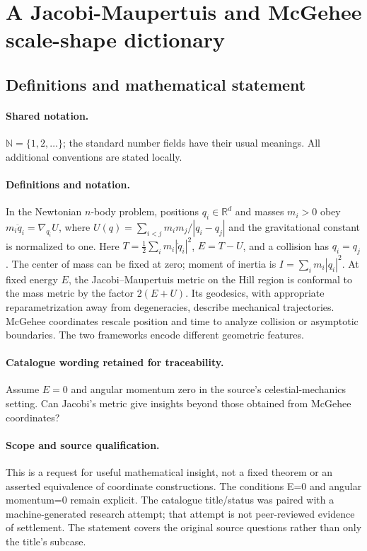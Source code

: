 \documentclass[11pt]{article}
\begin{document}
\section{A Jacobi-Maupertuis and McGehee scale-shape dictionary}\label{statement}

\subsection{Definitions and mathematical statement}

\paragraph{Shared notation.}$\mathbb N=\{1,2,\ldots\}$; the standard number fields have their usual meanings. All additional conventions are stated locally.


\paragraph{Definitions and notation.}In the Newtonian $n$-body problem, positions $q_i\in\mathbb R^d$ and masses $m_i>0$ obey $m_i\ddot q_i=\nabla_{q_i}U$, where $U(q)=\sum_{i<j}m_im_j/|q_i-q_j|$ and the gravitational constant is normalized to one. Here $T=\tfrac12\sum_i m_i|\dot q_i|^2$, $E=T-U$, and a collision has $q_i=q_j$. The center of mass can be fixed at zero; moment of inertia is $I=\sum_i m_i|q_i|^2$. At fixed energy $E$, the Jacobi--Maupertuis metric on the Hill region is conformal to the mass metric by the factor $2(E+U)$. Its geodesics, with appropriate reparametrization away from degeneracies, describe mechanical trajectories. McGehee coordinates rescale position and time to analyze collision or asymptotic boundaries. The two frameworks encode different geometric features.

\paragraph{Catalogue wording retained for traceability.}
Assume $E=0$ and angular momentum zero in the source’s celestial-mechanics setting. Can Jacobi’s metric give insights beyond those obtained from McGehee coordinates?
\paragraph{Scope and source qualification.}This is a request for useful mathematical insight, not a fixed theorem or an asserted equivalence of coordinate constructions. The conditions E=0 and angular momentum=0 remain explicit. The catalogue title/status was paired with a machine-generated research attempt; that attempt is not peer-reviewed evidence of settlement. The statement covers the original source questions rather than only the title’s subcase.
\end{document}
